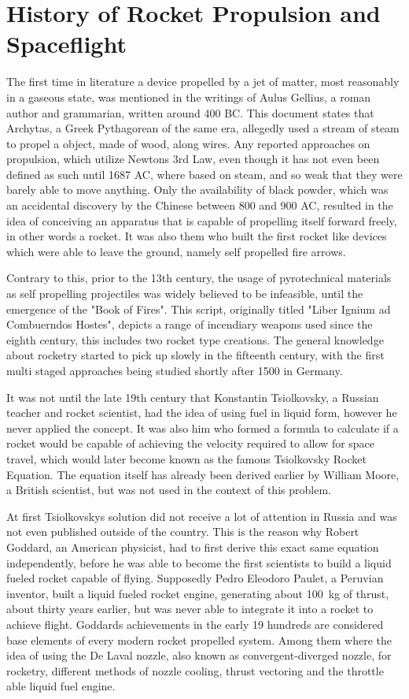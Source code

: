 \section{History of Rocket Propulsion and Spaceflight}
\author{Sebastian Schaffler}

The first time in literature a device propelled by a jet of matter, most reasonably in a gaseous state, was mentioned in the writings of Aulus Gellius, a roman author and grammarian, written around 400 BC. This document states that Archytas, a Greek Pythagorean of the same era, allegedly used a stream of steam to propel a object, made of wood, along wires. Any reported approaches on propulsion, which utilize Newtons 3rd Law, even though it has not even been defined as such until 1687 AC, where based on steam,  and so weak that they were barely able to move anything. Only the availability of black powder, which was an accidental discovery by the Chinese between 800 and 900 AC, resulted in the idea of conceiving an apparatus that is capable of propelling itself forward freely, in other words a rocket. It was also them who built the first rocket like devices which were able to leave the ground, namely self propelled fire arrows.

Contrary to this, prior to the 13th century, the usage of pyrotechnical materials as self propelling projectiles was  widely believed to be infeasible, until the emergence of the "Book of Fires". This script, originally titled "Liber Ignium ad Combuerndos Hostes", depicts a range of incendiary weapons used since the eighth century, this includes two rocket type creations. The general knowledge about rocketry started to pick up slowly in the fifteenth century, with the first multi staged approaches being studied shortly after 1500 in Germany.

It was not until the late 19th century that Konstantin Tsiolkovsky, a Russian teacher and rocket scientist, had the idea of using fuel in liquid form, however he never applied the concept. It was also him who formed a formula to calculate if a rocket would be capable of achieving the velocity required to allow for space travel, which would later become known as the famous Tsiolkovsky Rocket Equation. The equation itself has already been derived earlier by William Moore, a British scientist, but was not used in the context of this problem. 

At first Tsiolkovskys solution did not receive a lot of attention in Russia and was not even published outside of the country. This is the reason why Robert Goddard, an American physicist, had to first derive this exact same equation independently, before he was able to become the first scientists to build a liquid fueled rocket capable of flying. Supposedly Pedro Eleodoro Paulet, a Peruvian inventor, built a liquid fueled rocket engine, generating about \SI{100}{\kilo\gram} of thrust, about thirty years earlier, but was never able to integrate it into a rocket to achieve flight. Goddards achievements in the early 19 hundreds are considered base elements of every modern rocket propelled system. Among them where the idea of using the De Laval nozzle, also known as convergent-diverged nozzle, for rocketry, different methods of nozzle cooling, thrust vectoring and the throttle able liquid fuel engine.

